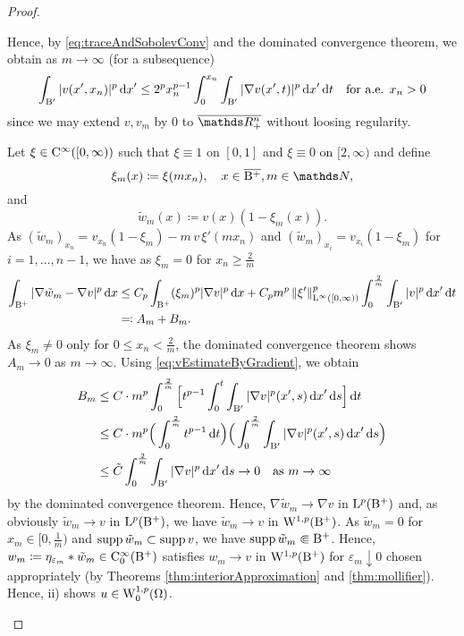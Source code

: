 \begin{proof}
\begin{enumerate}[i)]
    Hence, by \eqref{eq:traceAndSobolevConv} and the dominated convergence theorem, we obtain as $m \to \infty$ (for a subsequence)
    \begin{equation}
      \label{eq:vEstimateByGradient}
      \int_{\mathrm{B}'} |v(x',x_n)|^p \, {\operatorname{d}\!{x}}'
      \leq 2^p x_n^{p - 1} \int_0^{x_n} \int_{\mathrm{B}'} |\nabla v(x',t)|^p \, {\operatorname{d}\!{x}}' \, {\operatorname{d}\!{t}} \quad\text{for a.e. } x_n > 0
    \end{equation}
    since we may extend $v, v_m$ by $0$ to $\overline{\R^n_+}$ without loosing regularity.

    Let $\xi \in \mathrm{C}^\infty([0,\infty))$ such that $\xi \equiv 1$ on $[0,1]$ and $\xi \equiv 0$ on $[2,\infty)$ and define 
      $$\xi_m (x) \coloneqq \xi(mx_n), \quad x \in \overline{\BB^+}, m \in \N,$$ and 
      $$\tilde w_m(x) \coloneqq v(x)(1 - \xi_m(x)).$$
      As $(\tilde w_m)_{x_n} = v_{x_n}(1 - \xi_m) - m\, v\, \xi'(m x_n)$ and $(\tilde w_m)_{x_i} = v_{x_i}(1 - \xi_m)$ for $i = 1,\dots,n-1$, we have as $\xi_m =0$ for $x_n \geq \frac{2}{m}$
      \begin{align*}
      \int_{\mathrm{B}^+} |\nabla \tilde w_m - \nabla v|^p \, {\operatorname{d}\!{x}}
      &\leq C_p \int_{\mathrm{B}^+} (\xi_m)^p |\nabla v|^p \, {\operatorname{d}\!{x}} + C_p m^p\, \|\xi'\|_{\mathrm{L}^\infty([0,\infty))}^p \int_0^{\frac{2}{m}} \int_{\mathrm{B}'} |v|^p \, {\operatorname{d}\!{x}}' \, {\operatorname{d}\!{t}} \\
        &\eqqcolon A_m + B_m.
      \end{align*}
      As $\xi_m \neq 0$ only for $0 \leq x_n < \frac{2}{m}$, the dominated convergence theorem shows $A_m \to 0$ as $m \to \infty$.
      Using \eqref{eq:vEstimateByGradient}, we obtain
      \begin{align*}
      B_m 
      &\leq C \cdot m^p  \int_0^{\frac{2}{m}}\Big[ t^{p - 1} \int_0^{t} \int_{\BB'} |\nabla v|^p(x',s) \d x' \d s \Big] \d t \\
      &\leq C \cdot m^p \Big( \int_0^{\frac{2}{m}} t^{p - 1} \d t \Big) \Big( \int_0^{\frac{2}{m}} \int_{\BB'} |\nabla v|^p(x',s) \d x' \d s \Big) \\
      &\leq \tilde C \int_0^{\frac{2}{m}} \int_{\BB'} |\nabla v|^p \d x' \d s \to 0 \quad\text{as } m \to \infty 
      \end{align*}
      by the dominated convergence theorem.
      Hence, $\nabla \tilde w_m \to \nabla v$ in $\mathrm{L}^p(\mathrm{B}^+)$ and, as obviously $\tilde w_m \to v$ in $\mathrm{L}^p(\mathrm{B}^+)$, we have $\tilde w_m \to v$ in $\mathrm{W}^{1,p}(\mathrm{B}^+)$.
      As $\tilde w_m = 0$ for $x_m \in [0,\frac{1}{m})$ and $\operatorname{supp} \tilde w_m \subset \operatorname{supp} v$, we have $\operatorname{supp} \tilde w_m \Subset \mathrm{B}^+$.
        Hence, $w_m \coloneqq \eta_{\varepsilon_m} \ast \tilde w_m \in \mathrm{C}_0^\infty(\mathrm{B}^+)$ satisfies $w_m \to v$ in $\mathrm{W}^{1,p}(\mathrm{B}^+)$ for $\varepsilon_m \downarrow 0$ chosen appropriately (by Theorems \ref{thm:interiorApproximation} and \ref{thm:mollifier}).
        Hence, ii) shows $u \in \mathrm{W}_0^{1,p}(\Omega)$.


\end{enumerate}
\end{proof}
